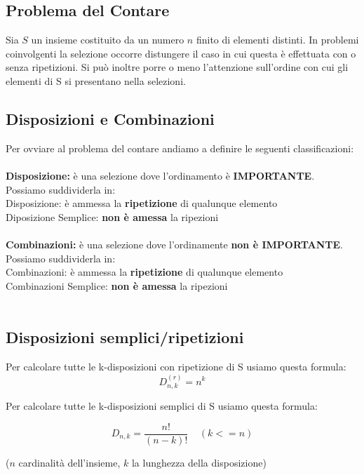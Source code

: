 \subsection{Problema del Contare}
Sia $S$ un insieme costituito da un numero $n$ finito di elementi distinti. In problemi coinvolgenti la selezione occorre distungere il caso in cui questa è effettuata con o senza ripetizioni. Si può inoltre porre o meno l'attenzione sull'ordine con cui gli elementi di S si presentano nella selezioni.

\subsection{Disposizioni e Combinazioni}
Per ovviare al problema del contare andiamo a definire le seguenti classificazioni:\\\\
\textbf{Disposizione:} è una selezione dove l'ordinamento è \textbf{IMPORTANTE}.\\
Possiamo suddividerla in:\\
Disposizione: è ammessa la \textbf{ripetizione} di qualunque elemento\\
Diposizione Semplice: \textbf{non è amessa} la ripezioni\\\\
\textbf{Combinazioni: } è una selezione dove l'ordinamente \textbf{non è IMPORTANTE}.\\
Possiamo suddividerla in:\\
Combinazioni: è ammessa la \textbf{ripetizione} di qualunque elemento\\
Combinazioni Semplice: \textbf{non è amessa} la ripezioni\\\\

\subsection{Disposizioni semplici/ripetizioni}
\label{sec:disposizioni}
Per calcolare tutte le k-disposizioni con ripetizione di S usiamo questa formula:
$$ D^{(r)}_{n,k} = n^k$$ 

Per calcolare tutte le k-disposizioni semplici di S usiamo questa formula:

$$ D_{n,k} = \frac{n!}{(n-k)!} \: \: \: \: \: (k<=n)$$ 

\begin{center}
($n$ cardinalità dell'insieme, $k$ la lunghezza della disposizione)
\end{center}

